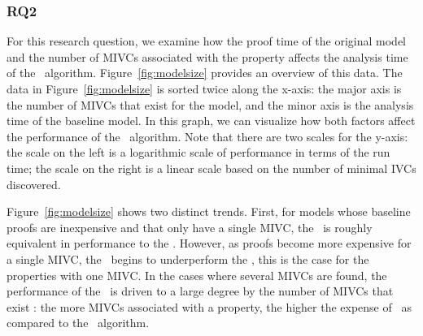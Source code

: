 %

\vspace{0.1in}
\subsubsection{RQ2} For this research question, we examine how the proof time of the original model and the number of MIVCs associated with the property affects the analysis time of the \aivcalg\ algorithm.  Figure~\ref{fig:modelsize} provides an overview of this data.  The data in Figure~\ref{fig:modelsize} is sorted twice along the x-axis: the major axis is the number of MIVCs that exist for the model, and the minor axis is the analysis time of the baseline model.  In this graph, we can visualize how both factors affect the performance of the \aivcalg\ algorithm.  Note that there are two scales for the y-axis: the scale on the left is a logarithmic scale of performance in terms of the run time; the scale on the right is a linear scale based on the number of minimal IVCs discovered.

Figure~\ref{fig:modelsize} shows two distinct trends.  First, for models whose baseline proofs are inexpensive and that only have a single MIVC, the \aivcalg\ is roughly equivalent in performance to the \ucbfalg.  %
However, as proofs become more expensive for a single MIVC, the \aivcalg\ begins to underperform the \ucbfalg , this is the case for the properties with one MIVC.  In the cases where several MIVCs are found, the performance of the \aivcalg\ is driven to a large degree by the number of MIVCs that exist : the more MIVCs associated with a property, the higher the expense of \aivcalg\ as compared to the \ucbfalg\ algorithm.

